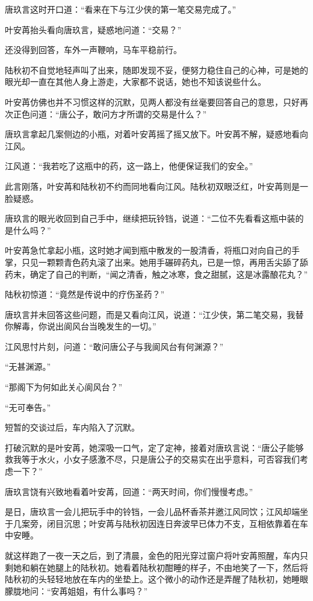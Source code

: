 唐玖言这时开口道：“看来在下与江少侠的第一笔交易完成了。”

叶安苒抬头看向唐玖言，疑惑地问道：“交易？”

还没得到回答，车外一声鞭响，马车平稳前行。

陆秋初不自觉地轻声叫了出来，随即发现不妥，便努力稳住自己的心神，可是她的眼光却一直在其他人身上游走，大家都不说话，她也不知该说些什么。

叶安苒仿佛也并不习惯这样的沉默，见两人都没有丝毫要回答自己的意思，只好再次正色问道：“唐公子，敢问方才所谓的交易是什么？”

唐玖言拿起几案侧边的小瓶，对着叶安苒摇了摇又放下。叶安苒不解，疑惑地看向江风。

江风道：“我若吃了这瓶中的药，这一路上，他便保证我们的安全。”

此言刚落，叶安苒和陆秋初不约而同地看向江风。陆秋初双眼泛红，叶安苒则是一脸疑惑。

唐玖言的眼光收回到自己手中，继续把玩铃铛，说道：“二位不先看看这瓶中装的是什么吗？”

叶安苒急忙拿起小瓶，这时她才闻到瓶中散发的一股清香，将瓶口对向自己的手掌，只见一颗颗青色药丸滚了出来。她用手碾碎药丸，已是一惊，再用舌尖舔了舔药末，确定了自己的判断，“闻之清香，触之冰寒，食之甜腻，这是冰露酿花丸？”

陆秋初惊道：“竟然是传说中的疗伤圣药？”

唐玖言并未回答这些问题，而是又看向江风，说道：“江少侠，第二笔交易，我替你解毒，你说出阆风台当晚发生的一切。”

江风思忖片刻，问道：“敢问唐公子与我阆风台有何渊源？”

“无甚渊源。”

“那阁下为何如此关心阆风台？”

“无可奉告。”

短暂的交谈过后，车内陷入了沉默。

打破沉默的是叶安苒，她深吸一口气，定了定神，接着对唐玖言说：“唐公子能够救我等于水火，小女子感激不尽，只是唐公子的交易实在出乎意料，可否容我们考虑一下？”

唐玖言饶有兴致地看着叶安苒，回道：“两天时间，你们慢慢考虑。”

是日，唐玖言一会儿把玩手中的铃铛，一会儿品杯香茶并邀江风同饮；江风却端坐于几案旁，闭目沉思；叶安苒与陆秋初因连日奔波早已体力不支，互相依靠着在车中安睡。

就这样跑了一夜一天之后，到了清晨，金色的阳光穿过窗户将叶安苒照醒，车内只剩她和躺在她腿上的陆秋初。她看着陆秋初酣睡的样子，不由地笑了一下，然后将陆秋初的头轻轻地放在车内的坐垫上。这个微小的动作还是弄醒了陆秋初，她睡眼朦胧地问：“安苒姐姐，有什么事吗？”


